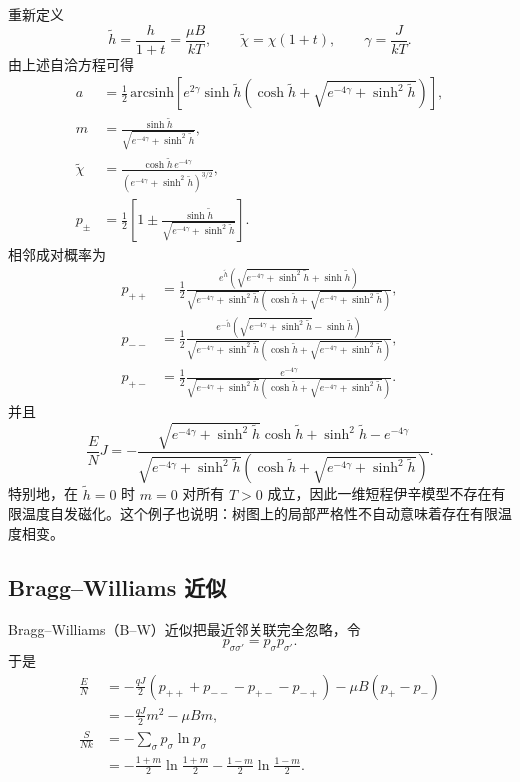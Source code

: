 重新定义
\begin{equation*}
	\widetilde h=\frac{h}{1+t}=\frac{\mu B}{kT},\qquad
	\widetilde\chi=\chi(1+t),\qquad
\gamma=\frac J{kT}.
\end{equation*}
由上述自洽方程可得
\begin{align*}
a&=\frac12\,\mathrm{arcsinh}\left[
e^{2\gamma}\sinh\widetilde h
\left(\cosh\widetilde h+
\sqrt{e^{-4\gamma}+\sinh^2\widetilde h}\right)
\right],\\
m&=\frac{\sinh\widetilde h}
{\sqrt{e^{-4\gamma}+\sinh^2\widetilde h}},\\
\widetilde\chi
&=\frac{\cosh\widetilde h\,e^{-4\gamma}}
{\left(e^{-4\gamma}+\sinh^2\widetilde h\right)^{3/2}},\\
p_\pm&=\frac12\left[
1\pm\frac{\sinh\widetilde h}
{\sqrt{e^{-4\gamma}+\sinh^2\widetilde h}}\right].
\end{align*}
相邻成对概率为
\begin{align*}
p_{++}
&=\frac12\frac{e^{\widetilde h}
\left(\sqrt{e^{-4\gamma}+\sinh^2\widetilde h}
+\sinh\widetilde h\right)}
{\sqrt{e^{-4\gamma}+\sinh^2\widetilde h}
\left(\cosh\widetilde h+
\sqrt{e^{-4\gamma}+\sinh^2\widetilde h}\right)},\\
p_{--}
&=\frac12\frac{e^{-\widetilde h}
\left(\sqrt{e^{-4\gamma}+\sinh^2\widetilde h}
-\sinh\widetilde h\right)}
{\sqrt{e^{-4\gamma}+\sinh^2\widetilde h}
\left(\cosh\widetilde h+
\sqrt{e^{-4\gamma}+\sinh^2\widetilde h}\right)},\\
p_{+-}
&=\frac12\frac{e^{-4\gamma}}
{\sqrt{e^{-4\gamma}+\sinh^2\widetilde h}
\left(\cosh\widetilde h+
\sqrt{e^{-4\gamma}+\sinh^2\widetilde h}\right)}.
\end{align*}
并且
\begin{equation*}
\frac ENJ
=-\frac{
\sqrt{e^{-4\gamma}+\sinh^2\widetilde h}\cosh\widetilde h
+\sinh^2\widetilde h-e^{-4\gamma}}
{\sqrt{e^{-4\gamma}+\sinh^2\widetilde h}
\left(\cosh\widetilde h+
\sqrt{e^{-4\gamma}+\sinh^2\widetilde h}\right)}.
\end{equation*}
特别地，在 \(\widetilde h=0\) 时 \(m=0\) 对所有 \(T>0\) 成立，因此一维短程伊辛模型不存在有限温度自发磁化。这个例子也说明：树图上的局部严格性不自动意味着存在有限温度相变。

\subsection{Bragg--Williams 近似}

Bragg--Williams（B--W）近似把最近邻关联完全忽略，令
\begin{equation*}
	p_{\sigma\sigma'}=p_\sigma p_{\sigma'}.
\end{equation*}
于是
\begin{align*}
\frac EN
&=-\frac{qJ}{2}
\left(p_{++}+p_{--}-p_{+-}-p_{-+}\right)
-\mu B(p_+-p_-)\\
&=-\frac{qJ}{2}m^2-\mu Bm,\\
\frac S{Nk}
&=-\sum_\sigma p_\sigma\ln p_\sigma\\
&=-\frac{1+m}{2}\ln\frac{1+m}{2}
-\frac{1-m}{2}\ln\frac{1-m}{2}.
\end{align*}

